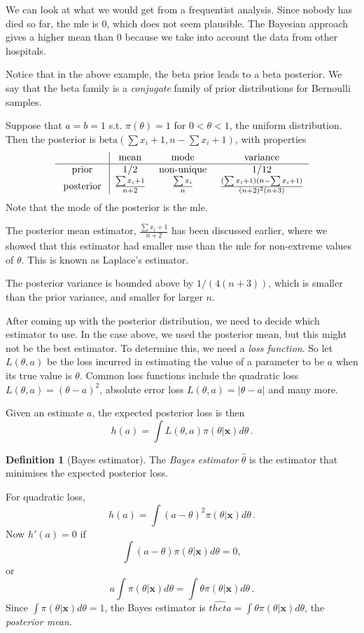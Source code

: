 \documentclass[a4paper,11pt]{article}
\theoremstyle{definition}
\newtheorem*{defn}{Definition}
\numberwithin{equation}{section}
\begin{document}
We can look at what we would get from a frequentist analysis. Since nobody has died so far, the mle is 0, which does not seem plausible. The Bayesian approach gives a higher mean than 0 because we take into account the data from other hospitals.

Notice that in the above example, the beta prior leads to a beta posterior. We say that the beta family is a \emph{conjugate} family of prior distributions for Bernoulli samples.

Suppose that $a=b=1$ s.t. $\pi(\theta)=1$ for $0<\theta<1$, the uniform distribution. Then the posterior is $\text{beta}(\sum x_i+1,n-\sum x_i+1)$, with properties
\[
\begin{array}{c | c c c}
     & \text{ mean } & \text{ mode } & \text{ variance }\\
     \hline
     \text{ prior } & 1/2 & \text{ non-unique } & 1/12\\
     \text{ posterior }&\frac{\sum x_i+1}{n+2} & \frac{\sum x_i}{n} & \frac{(\sum x_i+1)(n-\sum x_i+1)}{(n+2)^2(n+3)}
\end{array}
\]
Note that the mode of the posterior is the mle.

The posterior mean estimator, $\frac{\sum x_i+1}{n+2}$ has been discussed earlier, where we showed that this estimator had smaller mse than the mle for non-extreme values of $\theta$. This is known as Laplace's estimator.

The posterior variance is bounded above by $1/(4(n+3))$, which is smaller than the prior variance, and smaller for larger $n$.

After coming up with the posterior distribution, we need to decide which estimator to use. In the case above, we used the posterior mean, but this might not be the best estimator. To determine this, we need a \emph{loss function}. So let $L(\theta,a)$ be the loss incurred in estimating the value of a parameter to be $a$ when its true value is $\theta$. Common loss functions include the quadratic loss $L(\theta,a)=(\theta-a)^2$, absolute error loss $L(\theta,a)=|\theta-a|$ and many more.

Given an estimate $a$, the expected posterior loss is then
\[
h(a)=\int L(\theta,a)\pi(\theta|\mathbf{x})d\theta\,.
\]

\begin{defn}[Bayes estimator]
The \emph{Bayes estimator} $\hat{\theta}$ is the estimator that minimises the expected posterior loss.
\end{defn}

For quadratic loss, 
\[
h(a)=\int (a-\theta)^2\pi(\theta|\mathbf{x})d\theta\,.
\]
Now $h'(a)=0$ if
\[
\int(a-\theta)\pi(\theta|\mathbf{x})d\theta=0,
\]
or 
\[
a\int\pi(\theta|\mathbf{x})d\theta=\int\theta\pi(\theta|\mathbf{x})d\theta\,.
\]
Since $\int\pi(\theta|\mathbf{x})d\theta=1$, the Bayes estimator is $\hat{theta}=\int\theta\pi(\theta|\mathbf{x})d\theta$, the \emph{posterior mean}.
\end{document}
